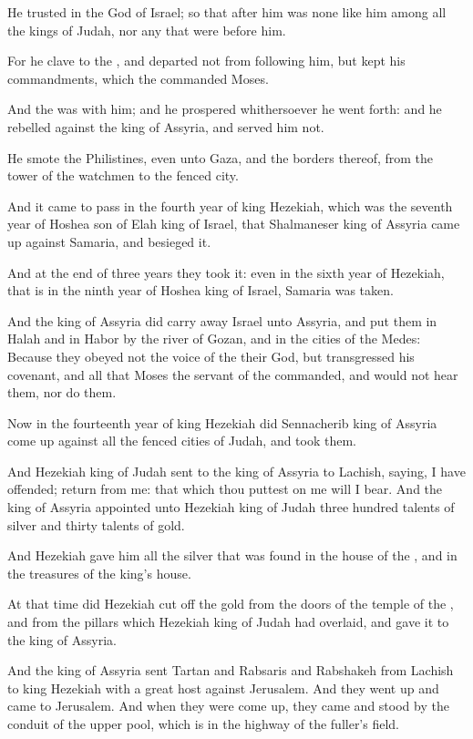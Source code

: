 \verse He trusted in the \LORD God of Israel; so that after him was none like him among all the kings of Judah, nor any that were before him.

\verse For he clave to the \LORD, and departed not from following him, but kept his commandments, which the \LORD commanded Moses.

\verse And the \LORD was with him; and he prospered whithersoever he went forth: and he rebelled against the king of Assyria, and served him not.

\verse He smote the Philistines, even unto Gaza, and the borders thereof, from the tower of the watchmen to the fenced city.

\verse And it came to pass in the fourth year of king Hezekiah, which was the seventh year of Hoshea son of Elah king of Israel, that Shalmaneser king of Assyria came up against Samaria, and besieged it.

\verse And at the end of three years they took it: even in the sixth year of Hezekiah, that is in the ninth year of Hoshea king of Israel, Samaria was taken.

\verse And the king of Assyria did carry away Israel unto Assyria, and put them in Halah and in Habor by the river of Gozan, and in the cities of the Medes: \verse Because they obeyed not the voice of the \LORD their God, but transgressed his covenant, and all that Moses the servant of the \LORD commanded, and would not hear them, nor do them.

\verse Now in the fourteenth year of king Hezekiah did Sennacherib king of Assyria come up against all the fenced cities of Judah, and took them.

\verse And Hezekiah king of Judah sent to the king of Assyria to Lachish, saying, I have offended; return from me: that which thou puttest on me will I bear. And the king of Assyria appointed unto Hezekiah king of Judah three hundred talents of silver and thirty talents of gold.

\verse And Hezekiah gave him all the silver that was found in the house of the \LORD, and in the treasures of the king's house.

\verse At that time did Hezekiah cut off the gold from the doors of the temple of the \LORD, and from the pillars which Hezekiah king of Judah had overlaid, and gave it to the king of Assyria.

\verse And the king of Assyria sent Tartan and Rabsaris and Rabshakeh from Lachish to king Hezekiah with a great host against Jerusalem. And they went up and came to Jerusalem. And when they were come up, they came and stood by the conduit of the upper pool, which is in the highway of the fuller's field.

